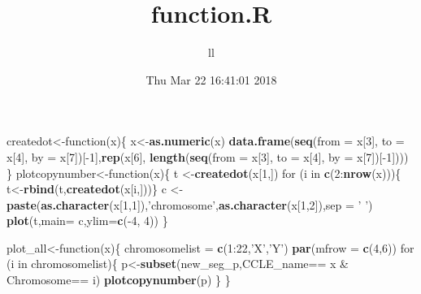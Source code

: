 \documentclass[]{article}
\title{function.R}
\author{ll}
\date{Thu Mar 22 16:41:01 2018}
\newenvironment{Shaded}{\begin{snugshade}}{\end{snugshade}}
\newcommand{\KeywordTok}[1]{\textcolor[rgb]{0.13,0.29,0.53}{\textbf{{#1}}}}
\newcommand{\DataTypeTok}[1]{\textcolor[rgb]{0.13,0.29,0.53}{{#1}}}
\newcommand{\DecValTok}[1]{\textcolor[rgb]{0.00,0.00,0.81}{{#1}}}
\newcommand{\StringTok}[1]{\textcolor[rgb]{0.31,0.60,0.02}{{#1}}}
\newcommand{\NormalTok}[1]{{#1}}
\begin{document}
\maketitle

\begin{Shaded}
\begin{Highlighting}[]
\NormalTok{createdot<-function(x)\{}
  \NormalTok{x<-}\KeywordTok{as.numeric}\NormalTok{(x)}
  \KeywordTok{data.frame}\NormalTok{(}\KeywordTok{seq}\NormalTok{(}\DataTypeTok{from =} \NormalTok{x[}\DecValTok{3}\NormalTok{], }\DataTypeTok{to =} \NormalTok{x[}\DecValTok{4}\NormalTok{], }\DataTypeTok{by =} \NormalTok{x[}\DecValTok{7}\NormalTok{])[-}\DecValTok{1}\NormalTok{],}\KeywordTok{rep}\NormalTok{(x[}\DecValTok{6}\NormalTok{],}
              \KeywordTok{length}\NormalTok{(}\KeywordTok{seq}\NormalTok{(}\DataTypeTok{from =} \NormalTok{x[}\DecValTok{3}\NormalTok{], }\DataTypeTok{to =} \NormalTok{x[}\DecValTok{4}\NormalTok{], }\DataTypeTok{by =} \NormalTok{x[}\DecValTok{7}\NormalTok{])[-}\DecValTok{1}\NormalTok{])))}
  \NormalTok{\}}
\NormalTok{plotcopynumber<-function(x)\{}
\NormalTok{t <-}\KeywordTok{createdot}\NormalTok{(x[}\DecValTok{1}\NormalTok{,])}
\NormalTok{for (i in }\KeywordTok{c}\NormalTok{(}\DecValTok{2}\NormalTok{:}\KeywordTok{nrow}\NormalTok{(x)))\{ t<-}\KeywordTok{rbind}\NormalTok{(t,}\KeywordTok{createdot}\NormalTok{(x[i,]))\}}
\NormalTok{c <-}\StringTok{ }\KeywordTok{paste}\NormalTok{(}\KeywordTok{as.character}\NormalTok{(x[}\DecValTok{1}\NormalTok{,}\DecValTok{1}\NormalTok{]),}\StringTok{'chromosome'}\NormalTok{,}\KeywordTok{as.character}\NormalTok{(x[}\DecValTok{1}\NormalTok{,}\DecValTok{2}\NormalTok{]),}\DataTypeTok{sep =} \StringTok{' '}\NormalTok{)}
\KeywordTok{plot}\NormalTok{(t,}\DataTypeTok{main=} \NormalTok{c,}\DataTypeTok{ylim=}\KeywordTok{c}\NormalTok{(-}\DecValTok{4}\NormalTok{, }\DecValTok{4}\NormalTok{))}
\NormalTok{\}}


\NormalTok{plot_all<-function(x)\{}
  \NormalTok{chromosomelist =}\StringTok{ }\KeywordTok{c}\NormalTok{(}\DecValTok{1}\NormalTok{:}\DecValTok{22}\NormalTok{,}\StringTok{'X'}\NormalTok{,}\StringTok{'Y'}\NormalTok{)}
  \KeywordTok{par}\NormalTok{(}\DataTypeTok{mfrow =} \KeywordTok{c}\NormalTok{(}\DecValTok{4}\NormalTok{,}\DecValTok{6}\NormalTok{))}
  \NormalTok{for (i in chromosomelist)\{}
    \NormalTok{p<-}\KeywordTok{subset}\NormalTok{(new_seg_p,CCLE_name==}\StringTok{ }\NormalTok{x &}\StringTok{ }\NormalTok{Chromosome==}\StringTok{ }\NormalTok{i)}
    \KeywordTok{plotcopynumber}\NormalTok{(p)}
  \NormalTok{\}}
\NormalTok{\}}
\end{Highlighting}
\end{Shaded}
\end{document}
